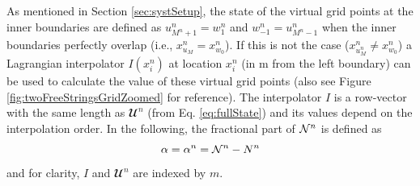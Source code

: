 As mentioned in Section \ref{sec:systSetup}, the state of the virtual grid points at the inner boundaries are defined as $u_{M^n+1}^n = w_1^n$ and $w_{-1}^n = u_{M^n-1}^n$ when the inner boundaries perfectly overlap  (i.e., $x^n_{u_M} = x^n_{w_0}$). If this is not the case ($x^n_{u_M^n} \neq x^n_{w_0}$) a Lagrangian interpolator $I(x_i^n)$ at location $x_i^n$ (in m from the left boundary) can be used to calculate the value of these virtual grid points (also see Figure \ref{fig:twoFreeStringsGridZoomed} for reference). The interpolator $I$ is a row-vector with the same length as $\mathbfcal{U}^n$ (from Eq. \eqref{eq:fullState}) and its values depend on the interpolation order. %
In the following, the fractional part of $\mathcal{N}^n$ %
is defined as 
\begin{equation}\label{eq:alphaDef}
    \alpha = \alpha^n = \Nfrac^n - N^n %
\end{equation}
 and for clarity, $I$ and $\mathbfcal{U}^n$ are indexed by $m$.
